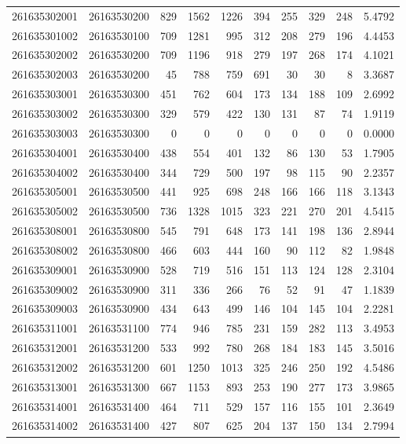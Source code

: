 \documentclass[
  11pt,
]{article}
\begin{document}
\begin{longtable}[t]{llrrrrrrrr}
261635302001 & 26163530200 & 829 & 1562 & 1226 & 394 & 255 & 329 & 248 & 5.4792\\
261635301002 & 26163530100 & 709 & 1281 & 995 & 312 & 208 & 279 & 196 & 4.4453\\
261635302002 & 26163530200 & 709 & 1196 & 918 & 279 & 197 & 268 & 174 & 4.1021\\
261635302003 & 26163530200 & 45 & 788 & 759 & 691 & 30 & 30 & 8 & 3.3687\\
261635303001 & 26163530300 & 451 & 762 & 604 & 173 & 134 & 188 & 109 & 2.6992\\
261635303002 & 26163530300 & 329 & 579 & 422 & 130 & 131 & 87 & 74 & 1.9119\\
261635303003 & 26163530300 & 0 & 0 & 0 & 0 & 0 & 0 & 0 & 0.0000\\
261635304001 & 26163530400 & 438 & 554 & 401 & 132 & 86 & 130 & 53 & 1.7905\\
261635304002 & 26163530400 & 344 & 729 & 500 & 197 & 98 & 115 & 90 & 2.2357\\
261635305001 & 26163530500 & 441 & 925 & 698 & 248 & 166 & 166 & 118 & 3.1343\\
261635305002 & 26163530500 & 736 & 1328 & 1015 & 323 & 221 & 270 & 201 & 4.5415\\
261635308001 & 26163530800 & 545 & 791 & 648 & 173 & 141 & 198 & 136 & 2.8944\\
261635308002 & 26163530800 & 466 & 603 & 444 & 160 & 90 & 112 & 82 & 1.9848\\
261635309001 & 26163530900 & 528 & 719 & 516 & 151 & 113 & 124 & 128 & 2.3104\\
261635309002 & 26163530900 & 311 & 336 & 266 & 76 & 52 & 91 & 47 & 1.1839\\
261635309003 & 26163530900 & 434 & 643 & 499 & 146 & 104 & 145 & 104 & 2.2281\\
261635311001 & 26163531100 & 774 & 946 & 785 & 231 & 159 & 282 & 113 & 3.4953\\
261635312001 & 26163531200 & 533 & 992 & 780 & 268 & 184 & 183 & 145 & 3.5016\\
261635312002 & 26163531200 & 601 & 1250 & 1013 & 325 & 246 & 250 & 192 & 4.5486\\
261635313001 & 26163531300 & 667 & 1153 & 893 & 253 & 190 & 277 & 173 & 3.9865\\
261635314001 & 26163531400 & 464 & 711 & 529 & 157 & 116 & 155 & 101 & 2.3649\\
261635314002 & 26163531400 & 427 & 807 & 625 & 204 & 137 & 150 & 134 & 2.7994\\

\end{longtable}
\end{document}
